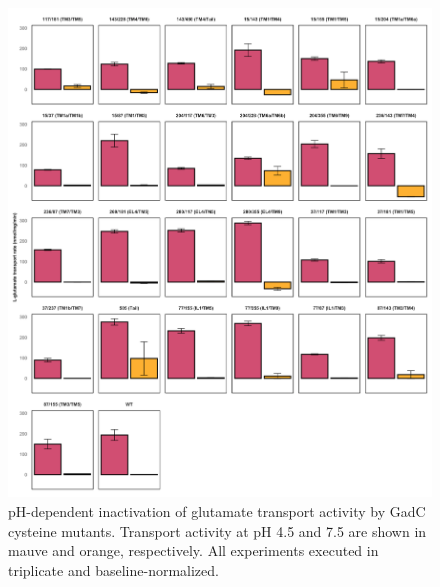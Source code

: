 \begin{figure}[h]
\centering
\includegraphics[width=5.5in]{Figures/gadc_supp_transport75.pdf}
\caption[pH-dependent inactivation of glutamate transport activity by GadC cysteine mutants.]{pH-dependent inactivation of glutamate transport activity by GadC cysteine mutants. Transport activity at pH 4.5 and 7.5 are shown in mauve and orange, respectively. All experiments executed in triplicate and baseline-normalized.}
\label{fig:gadc_supp_transport75}
\end{figure}

